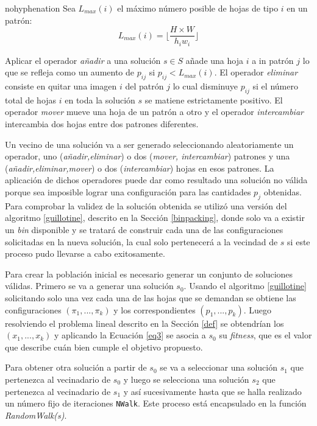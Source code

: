 \documentclass[a4paper,10pt,twocolumn]{article}
\begin{document}
\begin{hyphenrules}{nohyphenation}
Sea $L_{max}(i)$ el máximo número posible de hojas de tipo $i$ en un patrón:
$$ L_{max}(i) = \lfloor \frac{H \times W}{h_iw_i} \rfloor$$

Aplicar el operador \textit{añadir} a una solución $s \in S$ añade una hoja $i$ a in patrón $j$ lo que se refleja como un aumento de $p_{ij}$ si $p_{ij} < L_{max}(i)$. El operador \textit{eliminar} consiste en quitar una imagen $i$ del patrón $j$ lo cual disminuye $p_{ij}$ si el número total de hojas $i$ en toda la solución $s$ se matiene estrictamente positivo. El operador \textit{mover} mueve una hoja de un patrón a otro y el operador \textit{intercambiar} intercambia dos hojas entre dos patrones diferentes. 

Un vecino de una solución va a ser generado seleccionando aleatoriamente un operador, uno (\textit{añadir,eliminar}) o dos (\textit{mover, intercambiar}) patrones y una (\textit{añadir,eliminar,mover}) o dos (\textit{intercambiar}) hojas en esos patrones. La aplicación de dichos operadores puede dar como resultado una solución no válida porque sea imposible lograr una configuración para las cantidades $p_j$ obtenidas. Para comprobar la validez de la solución obtenida se utilizó una versión del algoritmo \ref{guillotine}, descrito en la Sección \ref{binpacking}, donde solo va a existir un \textit{bin} disponible y se tratará de construir cada una de las configuraciones solicitadas en la nueva solución, la cual solo pertenecerá a la vecindad de $s$ si este proceso pudo llevarse a cabo exitosamente.      

Para crear la población inicial es necesario generar un conjunto de soluciones válidas. Primero se va a generar una solución $s_0$. Usando el algoritmo \ref{guillotine} solicitando solo una vez cada una de las hojas que se demandan se obtiene las configuraciones $(\pi_1,...,\pi_k)$ y los correspondientes $(p_1,...,p_k)$. Luego resolviendo el problema lineal descrito en la Sección \ref{def} se obtendrían los $(x_1,...,x_k)$ y aplicando la Ecuación \ref{eq3} se asocia a $s_0$ su \textit{fitness}, que es el valor que describe cuán bien cumple el objetivo propuesto. 

Para obtener otra solución a partir de $s_0$ se va a seleccionar una solución $s_1$ que pertenezca al vecinadario de $s_0$ y luego se selecciona una solución $s_2$ que pertenezca al vecinadario de $s_1$ y así sucesivamente hasta que se halla realizado un
número fijo de iteraciones \texttt{NWalk}. Este proceso está encapsulado en la función \textit{RandomWalk(s)}. 


\end{hyphenrules}
\end{document}
